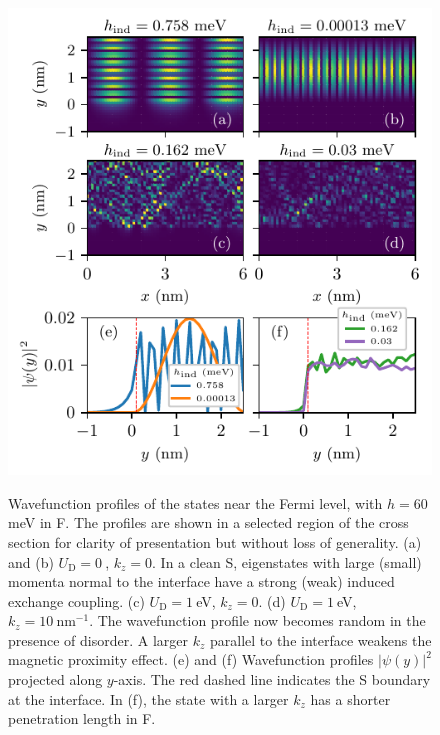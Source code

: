 \documentclass[aps,prl,twocolumn,superscriptaddress,showpacs,longbibliography]{revtex4-1}
\begin{document}
\begin{figure}
\centering
{\includegraphics[width = \linewidth]{Fig_4.pdf}}
\caption{Wavefunction profiles of the states near the Fermi level, with $h=60~$meV in F.
The profiles are shown in a selected region of the cross section for clarity of presentation but without loss of generality.
(a) and (b) $U_{\text{D}}=0~$, $k_z=0$.
In a clean S, eigenstates with large (small) momenta normal to the interface have a strong (weak) induced exchange coupling.
(c) $U_{\text{D}}=1~$eV, $k_z=0$.
(d) $U_{\text{D}}=1~$eV, $k_z=10~\text{nm}^{-1}$. 
The wavefunction profile now becomes random in the presence of disorder.
A larger $k_z$ parallel to the interface weakens the magnetic proximity effect.
(e) and (f) Wavefunction profiles $|\psi(y)|^2$ projected along $y$-axis. The red dashed line indicates the S boundary at the interface. In (f), the state with a larger $k_z$ has a shorter penetration length in F.
}
\label{fig:Fig_4}
\end{figure}
\end{document}
